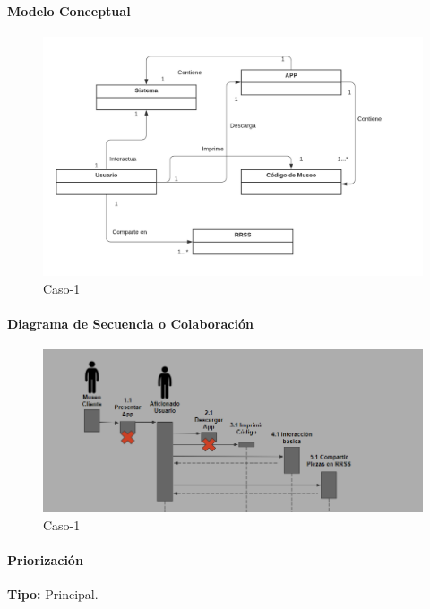 \paragraph{Modelo Conceptual}

\begin{figure}[H]
\centerline{\includegraphics[width=15cm]{imgs/ModeloConceptualCaso_6_3.png}}
\caption{Caso-1}
\label{fig}
\end{figure}

\paragraph{Diagrama de Secuencia o Colaboración}

\begin{figure}[H]
\centerline{\includegraphics[width=15cm]{imgs/CasoUso_6_2.PNG}}
\caption{Caso-1}
\label{fig}
\end{figure}

\paragraph{Priorización}
{\textbf {Tipo:}}
Principal.